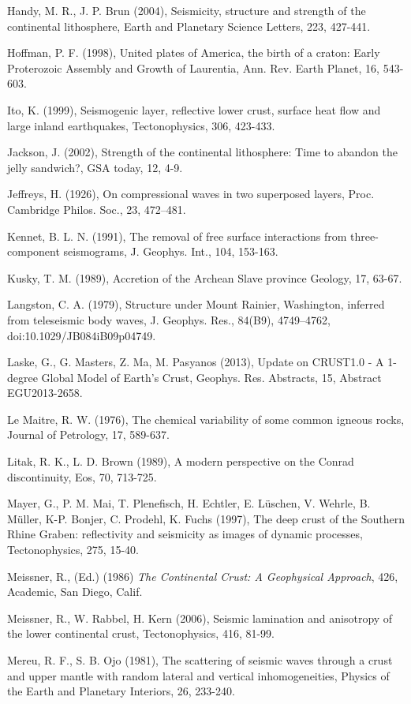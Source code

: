 \documentclass[review]{elsarticle}
\begin{document}
Handy, M. R.,  J. P. Brun (2004), Seismicity, structure and strength of the continental lithosphere, Earth and Planetary Science Letters, 223, 427-441.

Hoffman, P. F. (1998), United plates of America, the birth of a craton: Early Proterozoic Assembly and Growth of Laurentia, Ann. Rev. Earth Planet, 16, 543-603.

Ito, K. (1999), Seismogenic layer, reflective lower crust, surface heat flow and large inland earthquakes, Tectonophysics, 306, 423-433.

Jackson, J. (2002), Strength of the continental lithosphere: Time to abandon the jelly sandwich?, GSA today, 12, 4-9.

Jeffreys, H. (1926), On compressional waves in two superposed layers, Proc. Cambridge Philos. Soc., 23, 472–481.

Kennet, B. L. N. (1991), The removal of free surface interactions from three-component seismograms, J. Geophys. Int., 104, 153-163.

Kusky, T. M. (1989), Accretion of the Archean Slave province Geology, 17, 63-67.

Langston, C. A. (1979), Structure under Mount Rainier, Washington, inferred from teleseismic body waves, J. Geophys. Res., 84(B9), 4749–4762, doi:10.1029/JB084iB09p04749.

Laske, G., G. Masters, Z. Ma, M. Pasyanos (2013), Update on CRUST1.0 - A 1-degree Global Model of Earth's Crust, Geophys. Res. Abstracts, 15, Abstract EGU2013-2658.

Le Maitre, R. W. (1976), The chemical variability of some common igneous rocks, Journal of Petrology, 17, 589-637.

Litak, R. K., L. D. Brown (1989), A modern perspective on the Conrad discontinuity, Eos, 70, 713-725.

Mayer, G., P. M. Mai, T. Plenefisch, H. Echtler, E. Lüschen, V. Wehrle, B. Müller, K-P. Bonjer, C. Prodehl, K. Fuchs (1997), The deep crust of the Southern Rhine Graben: reflectivity and seismicity as images of dynamic processes, Tectonophysics, 275, 15-40.

Meissner, R., (Ed.) (1986) {\it The Continental Crust: A Geophysical Approach}, 426, Academic, San Diego, Calif.

Meissner, R., W. Rabbel, H. Kern (2006), Seismic lamination and anisotropy of the lower continental crust, Tectonophysics, 416, 81-99.

Mereu, R. F., S. B. Ojo (1981), The scattering of seismic waves through a crust and upper mantle with random lateral and vertical inhomogeneities, Physics of the Earth and Planetary Interiors, 26, 233-240.
\end{document}
